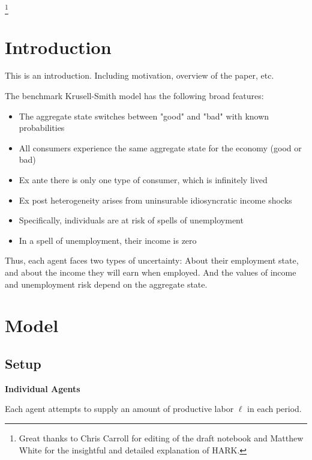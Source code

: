 \documentclass[titlepage]{\econtex}\providecommand{\texname}{KrusellSmithRep}%
\begin{document}
\thanks{Great thanks to Chris Carroll for editing of the draft notebook and Matthew White for the insightful and detailed explanation of HARK.}

\titlepagefinish


\newtheorem{defn}{Definition}
\newtheorem{theorem}{Theorem}

\section{Introduction}

\label{sec:intro}

This is an introduction. Including motivation, overview of the paper, etc. 

The benchmark Krusell-Smith model has the following broad features:

\begin{itemize}
\item The aggregate state switches between "good" and "bad" with known probabilities
\item  All consumers experience the same aggregate state for the economy (good or bad)
\item Ex ante there is only one type of consumer, which is infinitely lived
\item  Ex post heterogeneity arises from uninsurable idiosyncratic income shocks
\item Specifically, individuals are at risk of spells of unemployment
\item In a spell of unemployment, their income is zero
\end{itemize}
Thus, each agent faces two types of uncertainty: About their employment state, and about the income they will earn when employed.  And the values of income and unemployment risk depend on the aggregate state.

\section{Model}

\subsection{Setup}

\textbf{Individual Agents}

Each agent  attempts  to supply an amount of productive labor $\ell$ in each period. 
\end{document}
